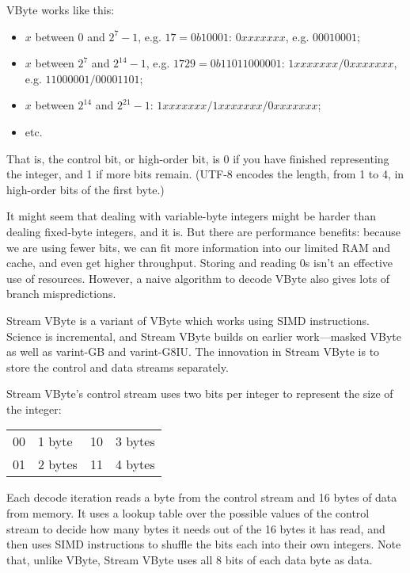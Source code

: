 VByte works like this:
\vspace*{-1em}
\begin{itemize}[noitemsep]
\item $x$ between 0 and $2^7-1$, e.g. $17 = 0b10001$: $0xxx xxxx$, e.g. $0001 0001$;
\item $x$ between $2^7$ and $2^{14}-1$, e.g. $1729 = 0b110 11000001$:
                   $1xxx xxxx/0xxx xxxx$, e.g. $1100 0001/0000 1101$;
\item $x$ between $2^{14}$ and $2^{21}-1$: $1xxx xxxx/1xxx xxxx/0xxx xxxx$;
\item etc.
\end{itemize}
That is, the control bit, or high-order bit, is 0 if you have finished representing the integer,
and 1 if more bits remain. (UTF-8 encodes the length, from 1 to 4, in high-order bits of the first byte.)

It might seem that dealing with variable-byte integers might be
harder than dealing fixed-byte integers, and it is. But there are performance benefits: because we are
using fewer bits, we can fit more information into our limited RAM and
cache, and even get higher throughput. Storing and reading 0s isn't an effective
use of resources. However, a naive algorithm to decode VByte also gives
lots of branch mispredictions.

Stream VByte is a variant of VByte which works using SIMD instructions.
Science is incremental, and Stream VByte builds on earlier work---masked VByte
as well as {\sc varint}-GB and {\sc varint}-G8IU. The innovation in
Stream VByte is to store the control and data streams separately.

Stream VByte's control stream uses two bits per integer to represent the size of the integer:
\begin{center}
\vspace*{-1em}
\begin{tabular}{ll@{~~~~~~~~}ll}
00 & 1 byte & 10 & 3 bytes\\
01 & 2 bytes & 11 & 4 bytes
\end{tabular}
\end{center}

Each decode iteration reads a byte from the control stream and 16 bytes of data from memory.
It uses a lookup table over the possible values of the control stream to decide how many
bytes it needs out of the 16 bytes it has read, and then uses SIMD instructions to shuffle
the bits each into their own integers. Note that, unlike VByte, Stream VByte uses all 8 bits
of each data byte as data.


